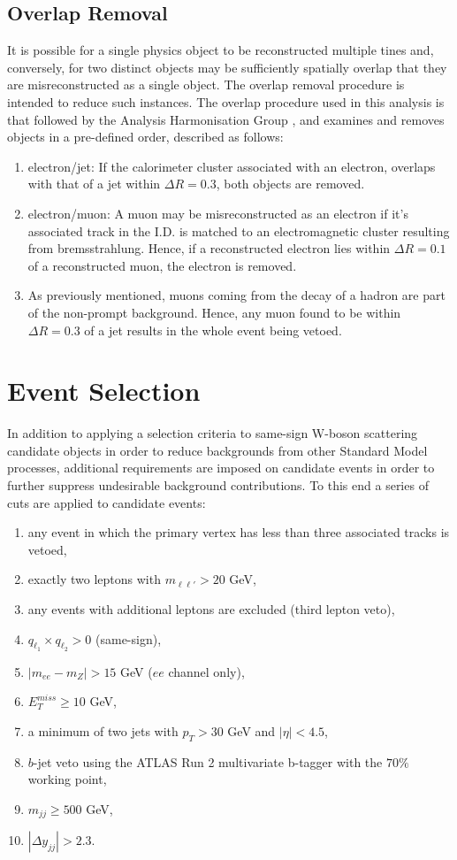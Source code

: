 \subsection{Overlap Removal}
It is possible for a single physics object to be reconstructed multiple tines and, conversely, for two distinct objects may be sufficiently spatially overlap that they are misreconstructed as a single object. The overlap removal procedure is intended to reduce such instances. The overlap procedure used in this analysis is that followed by the Analysis Harmonisation Group \cite{OLR}, and examines and removes objects in a pre-defined order, described as follows:
\begin{enumerate}
\item electron/jet: If the calorimeter cluster associated with an electron, overlaps with that of a jet within $\Delta R =0.3$, both objects are removed.
\item electron/muon: A muon may be misreconstructed as an electron if it's associated track in the I.D. is matched to an electromagnetic cluster resulting from bremsstrahlung. Hence, if a reconstructed electron lies within $ \Delta R =0.1$ of a reconstructed muon, the electron is removed.
\item As previously mentioned, muons coming from the decay of a hadron are part of the non-prompt background. Hence, any muon found to be within $\Delta R =0.3$ of a jet results in the whole event being vetoed.
\end{enumerate}
\section{Event Selection}
\label{event_selection}
In addition to applying a selection criteria to same-sign W-boson scattering candidate objects in order to reduce backgrounds from other Standard Model processes, additional requirements are imposed on candidate events in order to further suppress undesirable background contributions. To this end a series of cuts are applied to candidate events:
\begin{enumerate}
\item any event in which the primary vertex has less than three associated tracks is vetoed,
\item exactly two leptons with $m_{\ell \ell '} > 20$ GeV,
\item any events with additional leptons are excluded (third lepton veto),
\item $q_{\ell _{1}} \times q_{\ell _{2}} > 0$ (same-sign),
\item $|m_{ee} - m_{Z}| > 15$ GeV ($ee$ channel only),
\item $E_{T}^{miss} \geq 10$ GeV,
\item a minimum of two jets with $p_{T} > 30$ GeV and $|\eta | < 4.5$,
\item $b$-jet veto using the ATLAS Run 2 multivariate b-tagger with the $70\%$ working point,
\item $m_{jj} \geq 500$ GeV,
\item $| \Delta y_{jj} | > 2.3$.
\end{enumerate}


